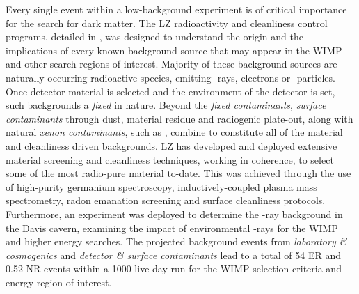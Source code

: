 Every single event within a low-background experiment is of critical importance for the search for dark matter. The LZ radioactivity and cleanliness control programs, detailed in \cite{lz_screening}, was designed to understand the origin and the implications of every known background source that may appear in the WIMP and other search regions of interest. Majority of these background sources are naturally occurring radioactive species, emitting \gamma{}-rays, electrons or \alpha{}-particles. Once detector material is selected and the environment of the detector is set, such backgrounds a \textit{fixed} in nature. Beyond the \textit{fixed contaminants}, \textit{surface contaminants} through dust, material residue and radiogenic plate-out, along with natural \textit{xenon contaminants}, such as \KrEF, combine to constitute all of the material and cleanliness driven backgrounds. LZ has developed and deployed extensive material screening and cleanliness techniques, working in coherence, to select some of the most radio-pure material to-date. This was achieved through the use of high-purity germanium spectroscopy, inductively-coupled plasma mass spectrometry, radon emanation screening and surface cleanliness protocols. Furthermore, an experiment was deployed to determine the \gamma{}-ray background in the Davis cavern, examining the impact of environmental \gamma{}-rays for the WIMP and higher energy searches. The projected background events from \textit{laboratory \& cosmogenics} and \textit{detector \& surface contaminants} lead to a total of 54 ER and 0.52 NR events within a 1000 live day run for the WIMP selection criteria and energy region of interest.

